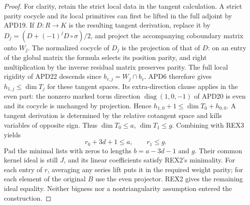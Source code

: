 \begin{proof}
For clarity, retain the strict local data in the tangent calculation.
A strict parity cocycle and its local primitives can first be lifted
in the full adjoint by APD19. If \(D:R\to K\) is the resulting
tangent derivation, replace it by
\(D_j=(D+(-1)^j D\circ\sigma)/2\), and project the accompanying
coboundary matrix onto \(W_j\). The normalized cocycle of \(D_j\)
is the projection of that of \(D\): on an entry of the global
matrix the formula selects its position parity, and right
multiplication by the inverse residual matrix preserves parity.
The full local rigidity of APD22 descends since
\(b_{v,j}=W_j\cap b_v\). APD6 therefore gives
\(h_{1,j}\le\dim T_j\) for these tangent spaces. Its extra-direction
clause applies in the even part: the nonzero marked torus direction
\(\operatorname{diag}(1,0,-1)\) of APD20 is even and its cocycle is
unchanged by projection. Hence \(h_{1,0}+1\le\dim T_0+h_{0,0}\).
A tangent derivation is determined by the relative cotangent space
and kills variables of opposite sign. Thus \(\dim T_0\le a\),
\(\dim T_1\le g\). Combining with REX3 yields
\[
 r_0+3d+1\le a,\qquad r_1\le g .
\]
Pad the minimal lists with zeros to lengths \(b=a-3d-1\) and \(g\).
Their common kernel ideal is still \(J\), and its linear coefficients
satisfy REX2's minimality. For each entry of \(r\), averaging any
series lift puts it in the required weight parity; for each element
of the original \(B\) use the even projector. REX2 gives the remaining
ideal equality. Neither bigness nor a nontriangularity assumption
entered the construction.
\end{proof}

